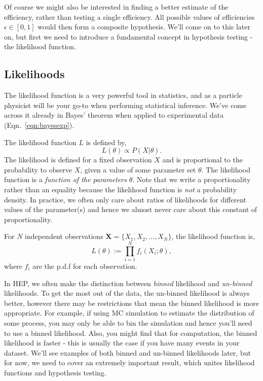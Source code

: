 Of course we might also be interested in finding a better estimate of the efficiency, rather than testing a single efficiency. All possible values of efficiencies $\epsilon \in [0,1]$ would then form a composite hypothesis. We'll come on to this later on, but first we need to introduce a fundamental concept in hypothesis testing - the likelihood function. 

\subsection{Likelihoods}
The likelihood function is a very powerful tool in statistics, and as a particle physicist will be your go-to when performing statistical inference. We've come across it already in Bayes' theorem when applied to experimental data (Eqn.~\ref{eqn:bayesexp}). 

The likelihood function $L$ is defined by, 
\begin{equation}\label{eqn:likelihood}
L(\theta) \propto P(X|\theta).
\end{equation}
The likelihood is defined for a fixed observation $X$ and is proportional to the probability to observe $X$, given a value of some parameter set $\theta$. The likelihood function is a \emph{function of the parameters} $\theta$. Note that we write a proportionality rather than an equality because the likelihood function is \emph{not} a probability density. In practice, we often only care about ratios of likelihoods for different values of the parameter(s) and hence we almost never care about this constant of proportionality. 

For $N$ independent observations $\mathbf{X}=\{X_{1},X_{2},...,X_{N}\}$, the likelihood function is, 
\begin{equation}\label{eqn:likelihoodprod}
L(\theta) := \prod_{i=1}^{N}f_{i}(X_{i};\theta),
\end{equation}
where $f_{i}$ are the p.d.f for each observation.

In HEP, we often make the distinction between  \emph{binned} likelihood and \emph{un-binned} likelihoods. To get the most out of the data, the un-binned likelihood is always better, however there may be restrictions that mean the binned likelihood is more appropriate. For example, if using MC simulation to estimate the distribution of some process, you may only be able to bin the simulation and hence you'll need to use a binned likelihood. Also, you might find that for computation, the binned likelihood is faster - this is usually the case if you have many events in your dataset. We'll see examples of both binned and un-binned likelihoods later, but for now, we need to cover an extremely important result, which unites likelihood functions and hypothesis testing.

